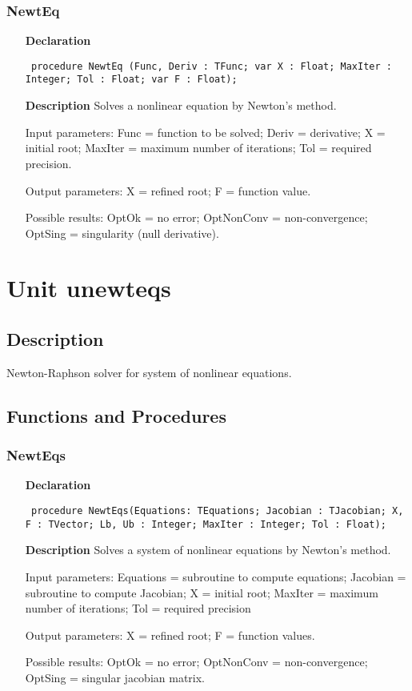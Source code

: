 \documentclass[12pt,a4paper,oneside]{report}
\newcommand{\declarationitem}[1]{\textbf{#1}}
\newcommand{\descriptiontitle}[1]{\textbf{#1}}
\newcommand{\code}[1]{\texttt{#1}}
\begin{document}
\subsubsection{NewtEq}
\label{unewteq-NewtEq}
\begin{itemize}\item[\declarationitem{Declaration}\hfill]
	\begin{flushleft}
		\code{
			procedure NewtEq (Func, Deriv : TFunc; var X : Float; MaxIter : Integer; Tol : Float; var F : Float);}
	\end{flushleft}
	\item[\descriptiontitle{Description}]
	Solves a nonlinear equation by Newton's method.
	
	Input parameters: Func = function to be solved; Deriv = derivative; X = initial root; MaxIter = maximum number of iterations; Tol = required precision.
	
	Output parameters: X = refined root; F = function value.
	
	Possible results: OptOk = no error; OptNonConv = non{-}convergence; \mbox{OptSing} = singularity (null derivative).
\end{itemize}
\section{Unit unewteqs}
\label{unewteqs}
\subsection{Description}
Newton{-}Raphson solver for system of nonlinear equations. 
\subsection{Functions and Procedures}
\subsubsection{NewtEqs}
\label{unewteqs-NewtEqs}
\begin{itemize}\item[\declarationitem{Declaration}\hfill]
	\begin{flushleft}
		\code{
			procedure NewtEqs(Equations: TEquations; Jacobian : TJacobian; X, F : TVector; Lb, Ub : Integer; MaxIter : Integer; Tol : Float);}
	\end{flushleft}
	\item[\descriptiontitle{Description}]
	Solves a system of nonlinear equations by Newton's method.
	
	Input parameters: Equations = subroutine to compute equations; Jacobian = subroutine to compute Jacobian; X = initial root; MaxIter = maximum number of iterations; Tol = required precision
	
	Output parameters: X = refined root; F = function values.
	
	Possible results: OptOk = no error; OptNonConv = non{-}convergence; OptSing = singular jacobian matrix.
	
\end{itemize}
\end{document}
